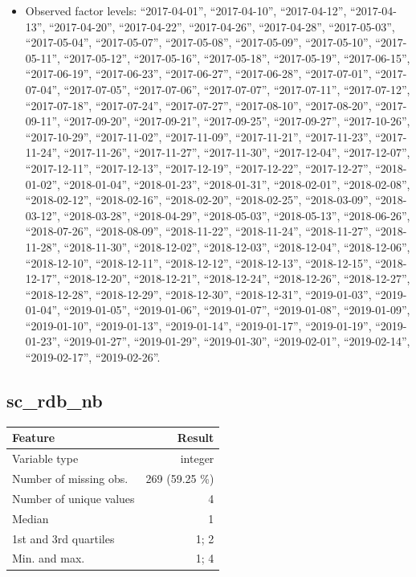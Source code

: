 \documentclass[
  letterpaper,
  DIV=11,
  numbers=noendperiod]{scrartcl}
\providecommand{\tightlist}{%
  \setlength{\itemsep}{0pt}\setlength{\parskip}{0pt}}
\begin{document}
\begin{itemize}
\tightlist
\item
  Observed factor levels: ``2017-04-01'', ``2017-04-10'',
  ``2017-04-12'', ``2017-04-13'', ``2017-04-20'', ``2017-04-22'',
  ``2017-04-26'', ``2017-04-28'', ``2017-05-03'', ``2017-05-04'',
  ``2017-05-07'', ``2017-05-08'', ``2017-05-09'', ``2017-05-10'',
  ``2017-05-11'', ``2017-05-12'', ``2017-05-16'', ``2017-05-18'',
  ``2017-05-19'', ``2017-06-15'', ``2017-06-19'', ``2017-06-23'',
  ``2017-06-27'', ``2017-06-28'', ``2017-07-01'', ``2017-07-04'',
  ``2017-07-05'', ``2017-07-06'', ``2017-07-07'', ``2017-07-11'',
  ``2017-07-12'', ``2017-07-18'', ``2017-07-24'', ``2017-07-27'',
  ``2017-08-10'', ``2017-08-20'', ``2017-09-11'', ``2017-09-20'',
  ``2017-09-21'', ``2017-09-25'', ``2017-09-27'', ``2017-10-26'',
  ``2017-10-29'', ``2017-11-02'', ``2017-11-09'', ``2017-11-21'',
  ``2017-11-23'', ``2017-11-24'', ``2017-11-26'', ``2017-11-27'',
  ``2017-11-30'', ``2017-12-04'', ``2017-12-07'', ``2017-12-11'',
  ``2017-12-13'', ``2017-12-19'', ``2017-12-22'', ``2017-12-27'',
  ``2018-01-02'', ``2018-01-04'', ``2018-01-23'', ``2018-01-31'',
  ``2018-02-01'', ``2018-02-08'', ``2018-02-12'', ``2018-02-16'',
  ``2018-02-20'', ``2018-02-25'', ``2018-03-09'', ``2018-03-12'',
  ``2018-03-28'', ``2018-04-29'', ``2018-05-03'', ``2018-05-13'',
  ``2018-06-26'', ``2018-07-26'', ``2018-08-09'', ``2018-11-22'',
  ``2018-11-24'', ``2018-11-27'', ``2018-11-28'', ``2018-11-30'',
  ``2018-12-02'', ``2018-12-03'', ``2018-12-04'', ``2018-12-06'',
  ``2018-12-10'', ``2018-12-11'', ``2018-12-12'', ``2018-12-13'',
  ``2018-12-15'', ``2018-12-17'', ``2018-12-20'', ``2018-12-21'',
  ``2018-12-24'', ``2018-12-26'', ``2018-12-27'', ``2018-12-28'',
  ``2018-12-29'', ``2018-12-30'', ``2018-12-31'', ``2019-01-03'',
  ``2019-01-04'', ``2019-01-05'', ``2019-01-06'', ``2019-01-07'',
  ``2019-01-08'', ``2019-01-09'', ``2019-01-10'', ``2019-01-13'',
  ``2019-01-14'', ``2019-01-17'', ``2019-01-19'', ``2019-01-23'',
  ``2019-01-27'', ``2019-01-29'', ``2019-01-30'', ``2019-02-01'',
  ``2019-02-14'', ``2019-02-17'', ``2019-02-26''.
\end{itemize}

\fullline

\subsection{sc\_rdb\_nb}\label{sc_rdb_nb}

\bminione

\begin{longtable}[]{@{}lr@{}}
\toprule\noalign{}
Feature & Result \\
\midrule\noalign{}
\endhead
\bottomrule\noalign{}
\endlastfoot
Variable type & integer \\
Number of missing obs. & 269 (59.25 \%) \\
Number of unique values & 4 \\
Median & 1 \\
1st and 3rd quartiles & 1; 2 \\
Min. and max. & 1; 4 \\
\end{longtable}
\end{document}
